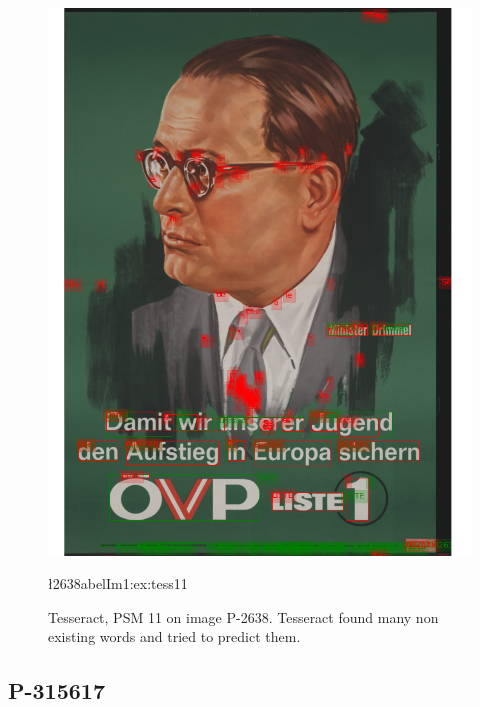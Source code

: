 \begin{figure}[hbtp!]  
    \centering
    \includegraphics[scale=0.36]{obrazky/plakaty/result_tesseract_vienna1_split_psm11-91.png}
    \caption{Tesseract, PSM 11  on image P-2638. Tesseract found many non existing words and tried to predict them.}
    \l2638abel{Im1:ex:tess11}
\end{figure}

\newpage
\subsection*{P-315617}

